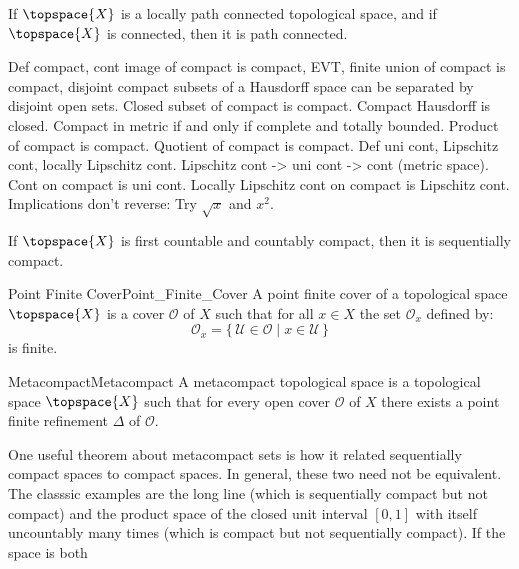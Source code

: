 \documentclass{article}                                                        %
\begin{document}
        \begin{theorem}
            If $\topspace{X}$ is a locally path connected topological space,
            and if $\topspace{X}$ is connected, then it is path connected.
        \end{theorem}
        Def compact, cont image of compact is compact, EVT, finite union of
        compact is compact, disjoint compact subsets of a Hausdorff space can be
        separated by disjoint open sets. Closed subset of compact is compact.
        Compact Hausdorff is closed. Compact in metric if and only if complete
        and totally bounded. Product of compact is compact. Quotient of compact
        is compact. Def uni cont, Lipschitz cont, locally Lipschitz cont.
        Lipschitz cont -> uni cont -> cont (metric space). Cont on compact is
        uni cont. Locally Lipschitz cont on compact is Lipschitz cont.
        Implications don't reverse: Try $\sqrt{x}$ and $x^{2}$.
        \begin{theorem}
            If $\topspace{X}$ is first countable and countably compact,
            then it is sequentially compact.
        \end{theorem}
        \begin{fdefinition}{Point Finite Cover}{Point_Finite_Cover}
            A point finite cover of a topological space $\topspace{X}$ is a
            cover $\mathcal{O}$ of $X$ such that for all $x\in{X}$ the set
            $\mathcal{O}_{x}$ defined by:
            \begin{equation*}
                \mathcal{O}_{x}=\{\,\mathcal{U}\in\mathcal{O}\;|\;
                    x\in\mathcal{U}\,\}
            \end{equation*}
            is finite.
        \end{fdefinition}
        \begin{fdefinition}{Metacompact}{Metacompact}
            A metacompact topological space is a topological space
            $\topspace{X}$ such that for every open cover $\mathcal{O}$ of $X$
            there exists a point finite refinement $\Delta$ of $\mathcal{O}$.
        \end{fdefinition}
        One useful theorem about metacompact sets is how it related sequentially
        compact spaces to compact spaces. In general, these two need not be
        equivalent. The classsic examples are the long line (which is
        sequentially compact but not compact) and the product space of the
        closed unit interval $[0,1]$ with itself uncountably many times
        (which is compact but not sequentially compact). If the space is both
\end{document}
